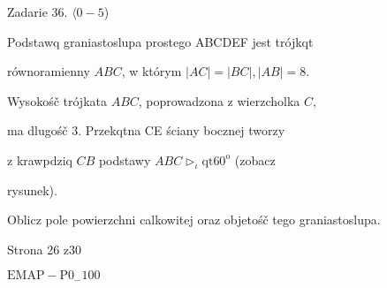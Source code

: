 \documentclass[a4paper,12pt]{article}
\begin{document}
Zadarie 36. $\langle 0-5$)

Podstawq graniastoslupa prostego ABCDEF jest trójkqt

równoramienny $ABC$, w którym $|AC|=|BC|, |AB|=8.$

Wysokośč trójkata $ABC$, poprowadzona z wierzcholka $C,$

ma dlugośč 3. Przekqtna CE ściany bocznej tworzy

z krawpdziq $CB$ podstawy $ABC \triangleright_{\iota}\mathrm{q}\mathrm{t} 60^{\mathrm{o}}$ (zobacz

rysunek).

Oblicz pole powierzchni calkowitej oraz objetośč tego graniastoslupa.

Strona 26 z30

$\mathrm{E}\mathrm{M}\mathrm{A}\mathrm{P}-\mathrm{P}0_{-}100$
\end{document}
